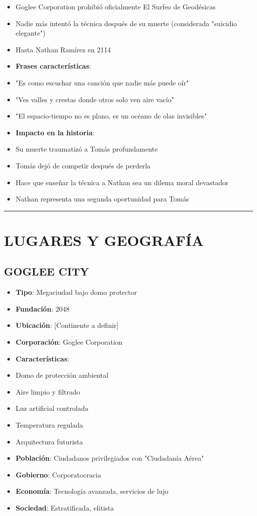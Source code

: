 \documentclass[11pt,a4paper]{report}
\begin{document}
\begin{itemize}
  \item Goglee Corporation prohibió oficialmente El Surfeo de Geodésicas
  \item Nadie más intentó la técnica después de su muerte (considerada "suicidio elegante")
  \item Hasta Nathan Ramírez en 2114
  \item \textbf{Frases características}: 
  \item "Es como escuchar una canción que nadie más puede oír"
  \item "Ves valles y crestas donde otros solo ven aire vacío"
  \item "El espacio-tiempo no es plano, es un océano de olas invisibles"
  \item \textbf{Impacto en la historia}: 
  \item Su muerte traumatizó a Tomás profundamente
  \item Tomás dejó de competir después de perderla
  \item Hace que enseñar la técnica a Nathan sea un dilema moral devastador
  \item Nathan representa una segunda oportunidad para Tomás

\end{itemize}
\bigskip\hrule\bigskip

\section{LUGARES Y GEOGRAFÍA}

\subsection{GOGLEE CITY}
\begin{itemize}
  \item \textbf{Tipo}: Megaciudad bajo domo protector
  \item \textbf{Fundación}: 2048
  \item \textbf{Ubicación}: [Continente a definir]
  \item \textbf{Corporación}: Goglee Corporation
  \item \textbf{Características}:
  \item Domo de protección ambiental
  \item Aire limpio y filtrado
  \item Luz artificial controlada
  \item Temperatura regulada
  \item Arquitectura futurista
  \item \textbf{Población}: Ciudadanos privilegiados con "Ciudadanía Aérea"
  \item \textbf{Gobierno}: Corporatocracia
  \item \textbf{Economía}: Tecnología avanzada, servicios de lujo
  \item \textbf{Sociedad}: Estratificada, elitista

\end{itemize}
\end{document}
